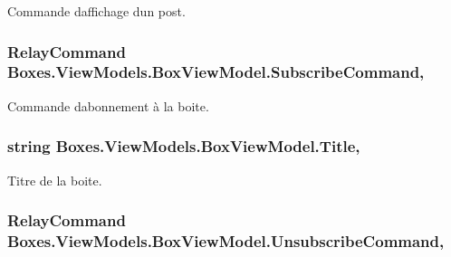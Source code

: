Commande d\textquotesingle{}affichage d\textquotesingle{}un post. 

\subsubsection[{\texorpdfstring{Subscribe\+Command}{SubscribeCommand}}]{\setlength{\rightskip}{0pt plus 5cm}Relay\+Command Boxes.\+View\+Models.\+Box\+View\+Model.\+Subscribe\+Command\hspace{0.3cm}{\ttfamily [get]}, {}}\hypertarget{class_boxes_1_1_view_models_1_1_box_view_model_a05a5f49c5193e7ee3733b14938f9405a}{}\label{class_boxes_1_1_view_models_1_1_box_view_model_a05a5f49c5193e7ee3733b14938f9405a}


Commande d\textquotesingle{}abonnement à la boite. 

\subsubsection[{\texorpdfstring{Title}{Title}}]{\setlength{\rightskip}{0pt plus 5cm}string Boxes.\+View\+Models.\+Box\+View\+Model.\+Title\hspace{0.3cm}{\ttfamily [get]}, {\ttfamily [set]}}\hypertarget{class_boxes_1_1_view_models_1_1_box_view_model_a214dac57bd4bc8cc3f05bbfd3da0cd39}{}\label{class_boxes_1_1_view_models_1_1_box_view_model_a214dac57bd4bc8cc3f05bbfd3da0cd39}


Titre de la boite. 

\subsubsection[{\texorpdfstring{Unsubscribe\+Command}{UnsubscribeCommand}}]{\setlength{\rightskip}{0pt plus 5cm}Relay\+Command Boxes.\+View\+Models.\+Box\+View\+Model.\+Unsubscribe\+Command\hspace{0.3cm}{\ttfamily [get]}, {}}\hypertarget{class_boxes_1_1_view_models_1_1_box_view_model_a461813602082d4e73290f57da2198e75}{}\label{class_boxes_1_1_view_models_1_1_box_view_model_a461813602082d4e73290f57da2198e75}



